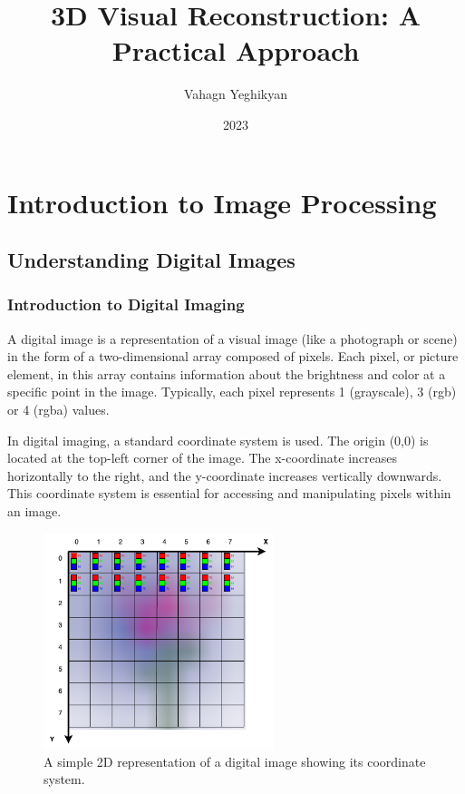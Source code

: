 \documentclass[11pt]{book}
\title{\textbf{3D Visual Reconstruction: A Practical Approach}}
\author{Vahagn Yeghikyan}
\date{2023}
\begin{document}
\frontmatter
\maketitle
\tableofcontents

\mainmatter

\part{Introduction to Image Processing}

\chapter{Understanding Digital Images}


\section{Introduction to Digital Imaging}

A digital image is a representation of a visual image (like a photograph or scene) in the form of a two-dimensional array composed of pixels. Each pixel, or picture element, in this array contains information about the brightness and color at a specific point in the image. Typically, each pixel represents 1 (grayscale), 3 (rgb) or 4 (rgba) values. 


In digital imaging, a standard coordinate system is used. The origin (0,0) is located at the top-left corner of the image. The x-coordinate increases horizontally to the right, and the y-coordinate increases vertically downwards. This coordinate system is essential for accessing and manipulating pixels within an image.

\begin{figure}[h]
\centering
\includegraphics[width=0.6\textwidth]{images/pixels.drawio.png}
\caption{A simple 2D representation of a digital image showing its coordinate system.}
\end{figure}
\end{document}
